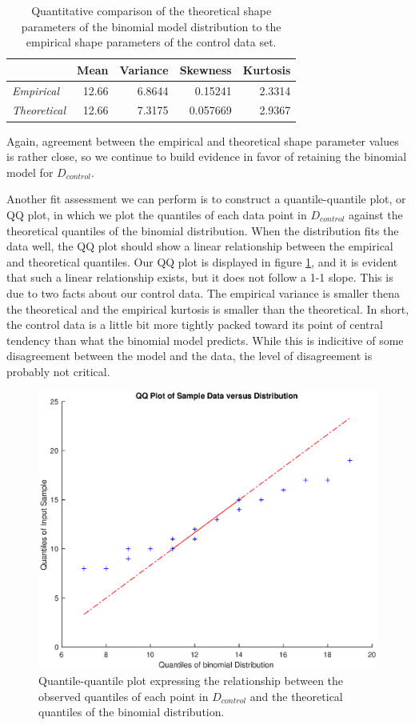 \documentclass{amsart}
\begin{document}
\begin{table}
\begin{tabular}{lrrrr}
\toprule
			&	{\bf Mean}	&	{\bf Variance}	&	{\bf Skewness}	&	{\bf Kurtosis}\\\midrule
{\sl Empirical}	&	12.66	&	6.8644	&	0.15241	&	2.3314\\ 
{\sl Theoretical}&	12.66   &	7.3175	&	0.057669		&	2.9367\\
\bottomrule
\end{tabular}
 \caption{Quantitative comparison of the theoretical shape parameters of the binomial model distribution to the empirical shape parameters of the control data set.\label{Tbl:quantitativeAssessment}}
\end{table}

Again, agreement between the empirical and theoretical shape parameter values is rather close, so we continue to build evidence in favor of retaining the binomial model for $D_{control}$.

Another fit assessment we can perform is to construct a quantile-quantile plot, or QQ plot, in which we plot the quantiles of each data point in $D_{control}$ against the theoretical quantiles of the binomial distribution. When the distribution fits the data well, the QQ plot should show a linear relationship between the empirical and theoretical quantiles. Our QQ plot is displayed in figure \ref{F:qqplot}, and it is evident that such a linear relationship exists, but it does not follow a 1-1 slope. This is due to two facts about our control data. The empirical variance is smaller thena the theoretical and the empirical kurtosis is smaller than the theoretical. In short, the control data is a little bit more tightly packed toward its point of central tendency than what the binomial model predicts. While this is indicitive of some disagreement between the model and the data, the level of disagreement is probably not critical.
\begin{figure}
\centering
\includegraphics[scale=0.55]{qqplotfinal}
\caption{
Quantile-quantile plot expressing the relationship between the observed quantiles of each point in $D_{control}$ and the theoretical quantiles of the binomial distribution.\label{F:qqplot}}
\end{figure}
\end{document}
